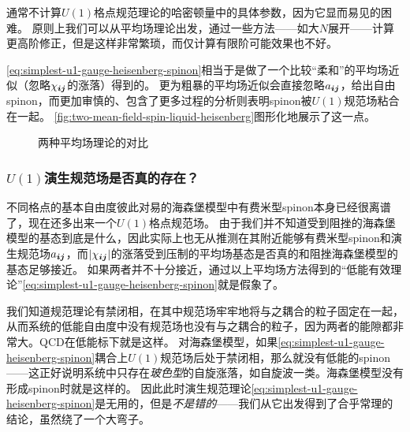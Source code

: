 通常不计算$U(1)$格点规范理论的哈密顿量中的具体参数，因为它显而易见的困难。
原则上我们可以从平均场理论出发，通过一些方法——如大$N$展开——计算更高阶修正，但是这样非常繁琐，而仅计算有限阶可能效果也不好。

\eqref{eq:simplest-u1-gauge-heisenberg-spinon}相当于是做了一个比较“柔和”的平均场近似（忽略$\chi_{\vb*{i} \vb*{j}}$的涨落）得到的。
更为粗暴的平均场近似会直接忽略$a_{\vb*{i} \vb*{j}}$，给出自由spinon，而更加审慎的、包含了更多过程的分析则表明spinon被$U(1)$规范场粘合在一起。
\autoref{fig:two-mean-field-spin-liquid-heisenberg}图形化地展示了这一点。

\begin{figure}
    \centering
    \caption{两种平均场理论的对比}
    \label{fig:two-mean-field-spin-liquid-heisenberg}
\end{figure}

\subsubsection{$U(1)$演生规范场是否真的存在？}

不同格点的基本自由度彼此对易的海森堡模型中有费米型spinon本身已经很离谱了，现在还多出来一个$U(1)$格点规范场。
由于我们并不知道受到阻挫的海森堡模型的基态到底是什么，因此实际上也无从推测在其附近能够有费米型spinon和演生规范场$a_{\vb*{i} \vb*{j}}$，而$\abs{\chi_{\vb*{i} \vb*{j}}}$的涨落受到压制的平均场基态是否真的和阻挫海森堡模型的基态足够接近。
如果两者并不十分接近，通过以上平均场方法得到的“低能有效理论”\eqref{eq:simplest-u1-gauge-heisenberg-spinon}就是假象了。

我们知道规范理论有禁闭相，在其中规范场牢牢地将与之耦合的粒子固定在一起，从而系统的低能自由度中没有规范场也没有与之耦合的粒子，因为两者的能隙都非常大。QCD在低能标下就是这样。
对海森堡模型，如果\eqref{eq:simplest-u1-gauge-heisenberg-spinon}耦合上$U(1)$规范场后处于禁闭相，那么就没有低能的spinon——这正好说明系统中只存在\emph{玻色型}的自旋涨落，如自旋波一类。海森堡模型没有形成spinon时就是这样的。
因此此时演生规范理论\eqref{eq:simplest-u1-gauge-heisenberg-spinon}是无用的，但是\emph{不是错的}——我们从它出发得到了合乎常理的结论，虽然绕了一个大弯子。


